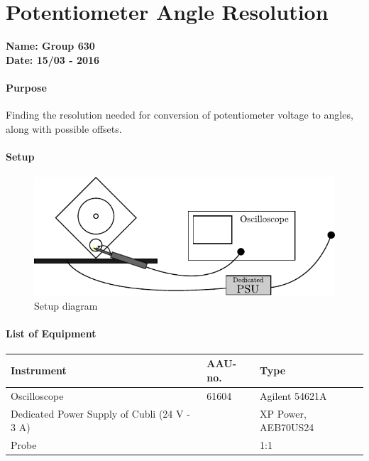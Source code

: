 \chapter{Potentiometer Angle Resolution}\label{app:potentiometerRes} 
\textbf{Name: Group 630}\\
\textbf{Date: 15/03 - 2016}

\subsubsection{Purpose}
Finding the resolution needed for conversion of potentiometer voltage to angles, along with possible offsets.

\subsubsection{Setup}
\begin{figure}[H]
  \centering
	\includegraphics[scale=1]{figures/LabSetupRangeTest.pdf}
	\caption{Setup diagram}
	\label{LabSetupRangeTest2}
\end{figure}\vspace{-5mm}

\subsubsection{List of Equipment}
\begin{table}[H]
	\begin{tabular}{|l|l|p{4.3cm}|}
		\hline%
		\textbf{Instrument}                                  &  \textbf{AAU-no.}  &  \textbf{Type}                       \\
		\hline%
		Oscilloscope                                         &  61604             &  Agilent 54621A		                   \\
		\hline%
		Dedicated Power Supply of Cubli \small{(24 V - 3 A)} &                    &  XP Power, AEB70US24                 \\
		\hline%
		Probe                                          &                &   1:1   \\
		\hline%
	\end{tabular}
\end{table}

